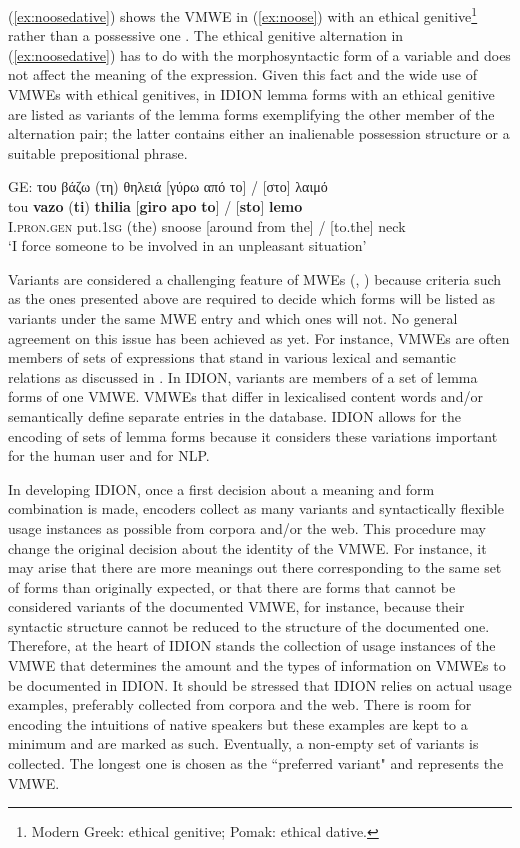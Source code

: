 \documentclass[output=paper,colorlinks,citecolor=brown]{langscibook}
\begin{document}
(\ref{ex:noosedative}) shows the VMWE in (\ref{ex:noose}) with an ethical  genitive\footnote{Modern Greek: ethical genitive; Pomak: ethical dative.} rather than a possessive one \citep{manfredstella}. The ethical genitive alternation in (\ref{ex:noosedative}) has to do with the morphosyntactic form of a variable and does not affect the meaning of the expression. Given this fact and the wide use of VMWEs with ethical genitives, in IDION lemma forms with an ethical genitive are listed as variants of the lemma forms exemplifying the other member of the alternation pair; the latter contains either an inalienable possession structure or a suitable prepositional phrase.


\ea
\label{ex:noosedative}
GE: του βάζω (τη) θηλειά [γύρω από το] / [στο] λαιμό\\
\gll tou \textbf{{vazo}} (\textbf{{ti}}) \textbf{{thilia}} [\textbf{{giro}} \textbf{{apo}} \textbf{{to}}] / [\textbf{{sto}}]  \textbf{{lemo}} \\
I.\textsc{pron.gen} put.\textsc{1sg} (the) snoose [around from the] / [to.the] neck \\
\glt ‘I force someone to be involved in an unpleasant situation'
\z


Variants are considered a challenging feature of MWEs (\cite{chechdatabase, duelme, villavicencio-etal-2004-multilingual}, ) because criteria such as the ones presented above are required to decide which forms will be listed as variants under the same MWE entry and which ones will not. No general agreement on this issue has been achieved as yet. For instance, VMWEs are often members of sets of expressions that stand in various lexical and semantic relations as discussed in . In IDION, variants are members of a set of lemma forms of one VMWE. VMWEs that differ in lexicalised content words and/or semantically define separate entries in the database. IDION allows for the encoding of sets of lemma forms because it considers these variations important for the human user and for NLP. 


 In developing IDION, once a first decision about a meaning and form combination is made,  encoders collect  as many variants and syntactically flexible usage instances as possible from corpora and/or the web. This procedure may change the original decision about the identity of the VMWE. For instance, it may arise that there are more meanings out there corresponding to the same set of forms than originally expected, or that there are forms that cannot be considered variants of the documented VMWE, for instance, because their syntactic structure cannot be reduced to the structure of the documented one.  Therefore, at the heart of IDION stands the collection of usage instances of the VMWE that determines the amount and the types of information on VMWEs to be documented in IDION. It should be stressed that IDION relies on actual usage examples, preferably collected from corpora and the web. There is room for encoding the intuitions of native speakers but these examples are kept to a minimum and are marked as such.  Eventually, a non-empty set of  variants is collected. The longest one is chosen as the ``preferred variant" and represents the VMWE.  
\end{document}

